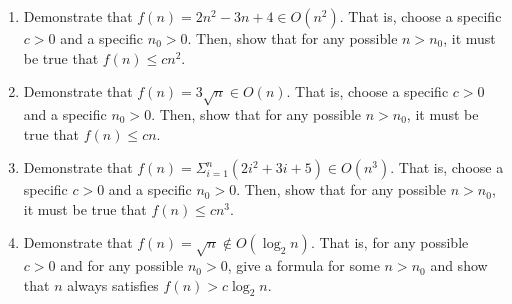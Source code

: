 \documentclass{article}
\begin{document}
\begin{enumerate}
  \begin{enumerate}

  \item Demonstrate that
    \(f(n) = 2n^2 - 3n + 4 \in O(n^2)\).
    That is, choose a specific \(c>0\) and a specific \(n_0 > 0\).
    Then, show that for any possible \(n > n_0\), it must be true that
    \(f(n) \leq c n^2\).

  \item Demonstrate that
    \(f(n) = 3 \sqrt{n} \in O(n)\).
    That is, choose a specific \(c>0\) and a specific \(n_0 > 0\).
    Then, show that for any possible \(n > n_0\), it must be true that
    \(f(n) \leq c n\).

  \item Demonstrate that
    \(f(n) = \Sigma_{i=1}^{n} (2i^2+3i+5) \in O(n^3)\).
    That is, choose a specific \(c>0\) and a specific \(n_0 > 0\).
    Then, show that for any possible \(n > n_0\), it must be true that
    \(f(n) \leq c n^3\).

  \item Demonstrate that
    \(f(n) = \sqrt{n} \not\in O(\log_2 n)\).
    That is, for any possible \(c>0\) and for any possible \(n_0 > 0\), give a
    formula for some \(n > n_0\) and show that \(n\) always satisfies
    \(f(n) > c \log_2 n\).

  \end{enumerate}

\end{enumerate}
\end{document}
